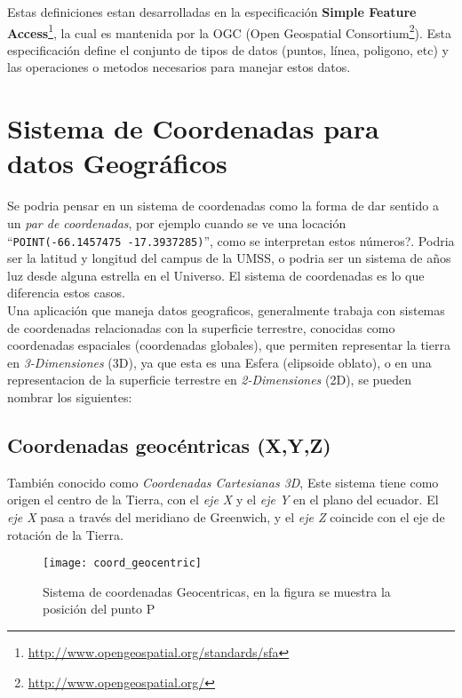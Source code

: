     Estas definiciones estan desarrolladas en la especificaci\'on \textbf{Simple Feature Access}\footnote{\url{http://www.opengeospatial.org/standards/sfa}}, la cual es mantenida por la OGC (Open Geospatial Consortium\footnote{\url{http://www.opengeospatial.org/}}). Esta especificaci\'on define el conjunto de tipos de datos (puntos, l\'inea, poligono, etc) y las operaciones o metodos necesarios para manejar estos datos.

  \section{Sistema de Coordenadas para datos Geográficos} %
  \label{sec:sistema_de_coordenadas_para_datos_geograficos}
    Se podria pensar en un sistema de coordenadas como la forma de dar sentido a un \emph{par de coordenadas}, por ejemplo cuando se ve una locaci\'on ``\verb|POINT(-66.1457475 -17.3937285)|'', como se interpretan estos n\'umeros?.
    Podria ser la latitud y longitud del campus de la UMSS, o podria ser un sistema de a\~nos luz desde alguna estrella en el Universo.
    El sistema de coordenadas es lo que diferencia estos casos.\\


    Una aplicaci\'on que maneja datos geograficos, generalmente trabaja con sistemas de coordenadas relacionadas con la superficie terrestre, conocidas como coordenadas espaciales (coordenadas globales), que permiten representar la tierra en \emph{3-Dimensiones} (3D), ya que esta es una Esfera (elipsoide oblato), o en una representacion de la superficie terrestre en \emph{2-Dimensiones} (2D), se pueden nombrar los siguientes:

    \subsection{Coordenadas geocéntricas (X,Y,Z)} %
      \label{sub:coordenadas_geocentricas}
        También conocido como \emph{Coordenadas Cartesianas 3D}, Este sistema tiene como origen el centro de la Tierra, con el \emph{eje X} y el \emph{eje Y} en el plano del ecuador. El \emph{eje X} pasa a través del meridiano de Greenwich, y el \emph{eje Z}  coincide con el eje de rotación de la Tierra.

        \begin{figure}[H]
          \begin{center}
            \texttt{[image: coord\_geocentric]}
          \end{center}
          \caption[Sistema de coordenadas Geocentricas ]{Sistema de coordenadas Geocentricas, en la figura se muestra la posici\'on del punto P}
          \label{fig:coord_geocentric}
        \end{figure}

